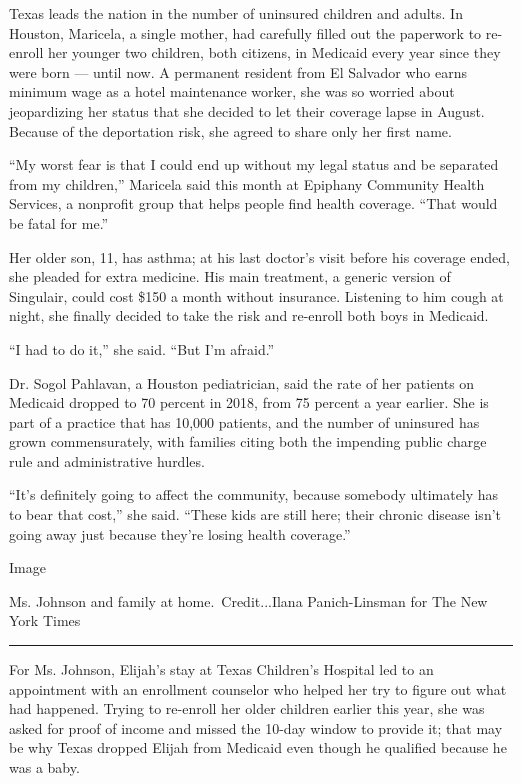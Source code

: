 Texas leads the nation in the number of uninsured children and adults.
In Houston, Maricela, a single mother, had carefully filled out the
paperwork to re-enroll her younger two children, both citizens, in
Medicaid every year since they were born --- until now. A permanent
resident from El Salvador who earns minimum wage as a hotel maintenance
worker, she was so worried about jeopardizing her status that she
decided to let their coverage lapse in August. Because of the
deportation risk, she agreed to share only her first name.

``My worst fear is that I could end up without my legal status and be
separated from my children,'' Maricela said this month at Epiphany
Community Health Services, a nonprofit group that helps people find
health coverage. ``That would be fatal for me.''

Her older son, 11, has asthma; at his last doctor's visit before his
coverage ended, she pleaded for extra medicine. His main treatment, a
generic version of Singulair, could cost \$150 a month without
insurance. Listening to him cough at night, she finally decided to take
the risk and re-enroll both boys in Medicaid.

``I had to do it,'' she said. ``But I'm afraid.''

Dr. Sogol Pahlavan, a Houston pediatrician, said the rate of her
patients on Medicaid dropped to 70 percent in 2018, from 75 percent a
year earlier. She is part of a practice that has 10,000 patients, and
the number of uninsured has grown commensurately, with families citing
both the impending public charge rule and administrative hurdles.

``It's definitely going to affect the community, because somebody
ultimately has to bear that cost,'' she said. ``These kids are still
here; their chronic disease isn't going away just because they're losing
health coverage.''

Image

Ms. Johnson and family at home.~Credit...Ilana Panich-Linsman for The
New York Times

\begin{center}\rule{0.5\linewidth}{\linethickness}\end{center}

For Ms. Johnson, Elijah's stay at Texas Children's Hospital led to an
appointment with an enrollment counselor who helped her try to figure
out what had happened. Trying to re-enroll her older children earlier
this year, she was asked for proof of income and missed the 10-day
window to provide it; that may be why Texas dropped Elijah from Medicaid
even though he qualified because he was a baby.

